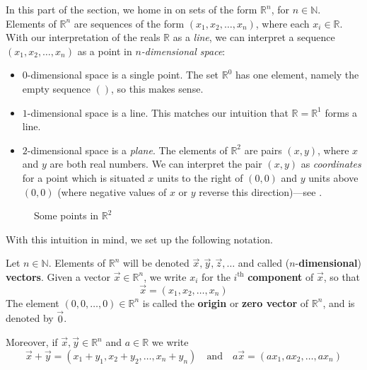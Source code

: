In this part of the section, we home in on sets of the form $\mathbb{R}^n$, for $n \in \mathbb{N}$. Elements of $\mathbb{R}^n$ are sequences of the form $(x_1,x_2,\dots,x_n)$, where each $x_i \in \mathbb{R}$. With our interpretation of the reals $\mathbb{R}$ as a \textit{line}, we can interpret a sequence $(x_1,x_2,\dots,x_n)$ as a point in \textit{$n$-dimensional space}:
\begin{itemize}
\item $0$-dimensional space is a single point. The set $\mathbb{R}^0$ has one element, namely the empty sequence $()$, so this makes sense.
\item $1$-dimensional space is a line. This matches our intuition that $\mathbb{R}=\mathbb{R}^1$ forms a line.
\item $2$-dimensional space is a \textit{plane}. The elements of $\mathbb{R}^2$ are pairs $(x,y)$, where $x$ and $y$ are both real numbers. We can interpret the pair $(x,y)$ as \textit{coordinates} for a point which is situated $x$ units to the right of $(0,0)$ and $y$ units above $(0,0)$ (where negative values of $x$ or $y$ reverse this direction)---see .
\end{itemize}

\begin{figure}[ht]
\centering
{}
\caption{Some points in $\mathbb{R}^2$}
\label{figPointsInR2}
\end{figure}

With this intuition in mind, we set up the following notation.

\begin{notation}
\label{ntnVectorsInRn}
Let $n \in \mathbb{N}$. Elements of $\mathbb{R}^n$ will be denoted $\vec x, \vec y, \vec z, \dots$  and called ($n$-\textbf{dimensional}) \textbf{vectors}. Given a vector $\vec x \in \mathbb{R}^n$, we write $x_i$ for the $i^{\text{th}}$ \textbf{component} of $\vec x$, so that
\[ \vec x = (x_1,x_2,\dots,x_n) \]
The element $(0,0,\dots,0) \in \mathbb{R}^n$ is called the \textbf{origin} or \textbf{zero vector} of $\mathbb{R}^n$, and is denoted by $\vec 0$.

Moreover, if $\vec x, \vec y \in \mathbb{R}^n$ and $a \in \mathbb{R}$ we write
\[ \vec x + \vec y = (x_1+y_1,x_2+y_2,\dots,x_n+y_n) \quad \text{and} \quad a \vec x = (ax_1,ax_2,\dots,ax_n) \]
\end{notation}

